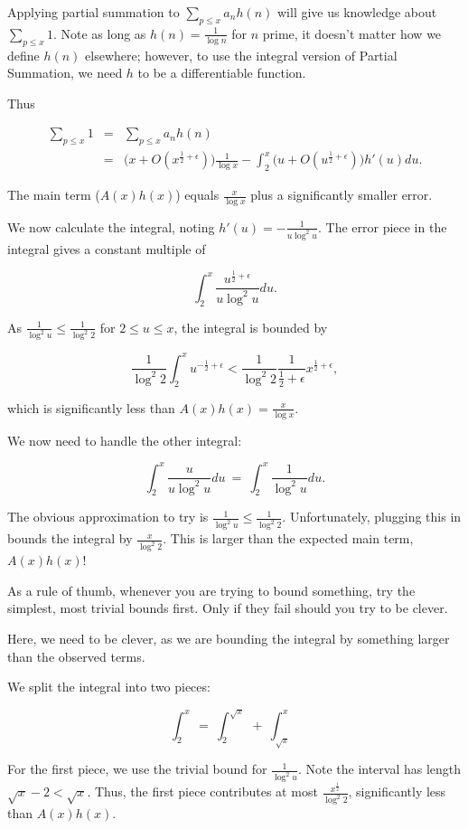 \documentclass[12pt,letterpaper]{report}
\newcommand\be{\begin{equation}}
\newcommand\ee{\end{equation}}
\newcommand\bea{\begin{eqnarray}}
\newcommand\eea{\end{eqnarray}}
\newcommand{\foh}{\frac{1}{2}}  %
\begin{document}
Applying partial summation to $\sum_{p \le x} a_n h(n)$ will give
us knowledge about $\sum_{p \le x} 1$. Note as long as $h(n) =
\frac{1}{\log n}$ for $n$ prime, it doesn't matter how we define
$h(n)$ elsewhere; however, to use the integral version of Partial
Summation, we need $h$ to be a differentiable function.

Thus

\bea \sum_{p \le x} 1 & = & \sum_{p \le x} a_n h(n) \nonumber\\
&=& \Big(x + O(x^{\foh + \epsilon}) \Big) \frac{1}{\log x} -
\int_2^x \Big(u + O(u^{\foh + \epsilon}) \Big) h'(u)du. \eea

The main term ($A(x)h(x)$) equals $\frac{x}{\log x}$ plus a
significantly smaller error.

We now calculate the integral, noting $h'(u) = - \frac{1}{u \log^2
u}$. The error piece in the integral gives a constant multiple of

\be \int_2^x \frac{u^{\foh + \epsilon} }{u \log^2 u}du. \ee

As $\frac{1}{\log^2 u} \le \frac{1}{\log^2 2}$ for $2\le u \le x$,
the integral is bounded by

\be \frac{1}{\log^2 2} \int_2^x u^{-\foh + \epsilon} <
\frac{1}{\log^2 2} \frac{1}{\foh + \epsilon} x^{\foh + \epsilon},
\ee

which is significantly less than $A(x)h(x) = \frac{x}{\log x}$.

We now need to handle the other integral:

\be \int_2^x \frac{u}{u \log^2 u}du \ = \ \int_2^x \frac{1}{\log^2
u} du. \ee

The obvious approximation to try is $\frac{1}{\log^2 u} \le
\frac{1}{\log^2 2}$. Unfortunately, plugging this in bounds the
integral by $\frac{x}{\log^2 2}$. This is larger than the expected
main term, $A(x)h(x)$!

As a rule of thumb, whenever you are trying to bound something,
try the simplest, most trivial bounds first. Only if they fail
should you try to be clever.

Here, we need to be clever, as we are bounding the integral by
something larger than the observed terms.

We split the integral into two pieces:

\be \int_2^x \ = \ \int_2^{\sqrt{x}} \ + \ \int_{\sqrt{x}}^x \ee

For the first piece, we use the trivial bound for $\frac{1}{\log^2
u}$. Note the interval has length $\sqrt{x} - 2 < \sqrt{x}$. Thus,
the first piece contributes at most $\frac{x^\foh}{\log^2 2}$,
significantly less than $A(x)h(x)$.
\end{document}
